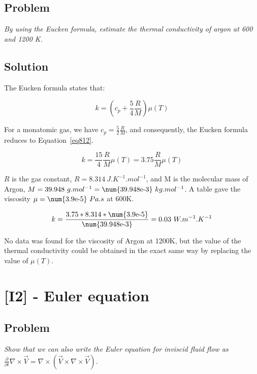 \subsection{Problem}
\textit{By using the Eucken formula, estimate the thermal conductivity of argon at 600 and 1200 K.}

\subsection{Solution}

The Eucken formula states that:

\begin{equation}\label{eq811}
k = \left( c_p + \frac{5}{4}\frac{R}{M} \right) \mu (T)
\end{equation}

For a monatomic gas, we have $c_p = \frac{5}{2}\frac{R}{M}$, and consequently, the Eucken formula reduces to Equation~\ref{eq812}.

\begin{equation}\label{eq812}
k = \frac{15}{4}\frac{R}{M} \mu (T) = 3.75 \frac{R}{M} \mu (T)
\end{equation}

$R$ is the gas constant, $R=8.314\ J.K^{-1}.mol^{-1}$, and M is the molecular mass of Argon, $M = 39.948\ g.mol^{-1} = \text{\num{39.948e-3}}\ kg.mol^{-1}$. A table gave the viscosity $\mu = \text{\num{3.9e-5}}\ Pa.s$ at 600K.

\begin{equation}\label{eq813}
k = \frac{3.75*8.314*\text{\num{3.9e-5}}}{\text{\num{39.948e-3}}} = 0.03\ W.m^{-1}.K^{-1}
\end{equation}


No data was found for the viscosity of Argon at 1200K, but the value of the thermal conductivity could be obtained in the exact same way by replacing the value of $\mu (T)$.

\section{[I2] - Euler equation}
\label{prob85}

\subsection{Problem}
\textit{Show that we can also write the Euler equation for inviscid fluid flow as $\frac{\partial}{\partial t}\nabla \times \vec{V} = \nabla \times (\vec{V} \times \nabla \times \vec{V})$.}


